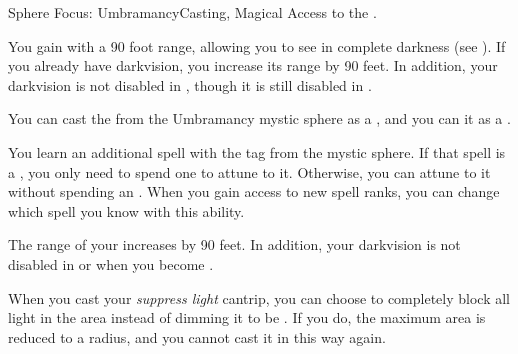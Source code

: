     \begin{feat}{Sphere Focus: Umbramancy}{Casting, Magical}
        \featpre Access to the  .

         You gain  with a 90 foot range, allowing you to see in complete darkness (see ).
        If you already have darkvision, you increase its range by 90 feet.
        In addition, your darkvision is not disabled in , though it is still disabled in .

         You can cast the   from the Umbramancy mystic sphere as a , and you can  it as a .

         You learn an additional spell with the  tag from the  mystic sphere.
        If that spell is a , you only need to spend one  to attune to it.
        Otherwise, you can attune to it without spending an .
        When you gain access to new spell ranks, you can change which spell you know with this ability.

         The range of your  increases by 90 feet.
        In addition, your darkvision is not disabled in  or when you become \dazzled.

         When you cast your \textit{suppress light} cantrip, you can choose to completely block all light in the area instead of dimming it to be .
        If you do, the maximum area is reduced to a \medarea radius, and you  cannot cast it in this way again.
    \end{feat}

